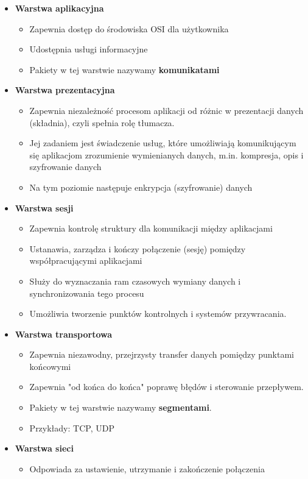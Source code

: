 \documentclass[a4paper,twoside]{article}
\begin{document}
\begin{itemize}
	\item \textbf{Warstwa aplikacyjna}
	\begin{itemize}
		\item Zapewnia dostęp do środowiska OSI dla użytkownika
		\item Udostępnia usługi informacyjne
		\item Pakiety w tej warstwie nazywamy \textbf{komunikatami}
	\end{itemize}
	\item \textbf{Warstwa prezentacyjna}
	\begin{itemize}
		\item Zapewnia niezależność procesom aplikacji od różnic w prezentacji danych (składnia), czyli spełnia rolę tłumacza.
		\item Jej zadaniem jest świadczenie usług, które umożliwiają komunikującym się aplikacjom zrozumienie wymienianych danych, m.in. kompresja, opis i szyfrowanie danych
		\item Na tym poziomie następuje enkrypcja (szyfrowanie) danych
	\end{itemize}  
	\item \textbf{Warstwa sesji}
	\begin{itemize}
		\item Zapewnia kontrolę struktury dla komunikacji między aplikacjami
		\item Ustanawia, zarządza i kończy połączenie (sesję) pomiędzy współpracującymi aplikacjami
		\item Służy do wyznaczania ram czasowych wymiany danych i synchronizowania tego procesu
		\item Umożliwia tworzenie punktów kontrolnych i systemów przywracania.
	\end{itemize}
	\item \textbf{Warstwa transportowa}
	\begin{itemize}
		\item Zapewnia niezawodny, przejrzysty transfer danych pomiędzy punktami końcowymi
		\item Zapewnia "od końca do końca" poprawę błędów i sterowanie przepływem.
		\item Pakiety w tej warstwie nazywamy \textbf{segmentami}.
		\item Przykłady: TCP, UDP
	\end{itemize}
	\item \textbf{Warstwa sieci}
	\begin{itemize}
		\item Odpowiada za ustawienie, utrzymanie i zakończenie połączenia

\end{itemize}
\end{itemize}
\end{document}
